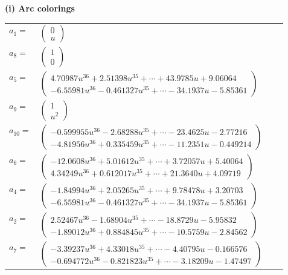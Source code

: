\documentclass[1p]{elsarticle_modified}
\theoremstyle{definition}
\begin{document}
\flushleft \textbf{(i) Arc colorings}\\
\begin{tabular}{m{7pt} m{180pt} m{7pt} m{180pt} }
\flushright $a_{1}=$&$\begin{pmatrix}0\\u\end{pmatrix}$ \\
\flushright $a_{8}=$&$\begin{pmatrix}1\\0\end{pmatrix}$ \\
\flushright $a_{5}=$&$\begin{pmatrix}4.70987 u^{36}+2.51398 u^{35}+\cdots+43.9785 u+9.06064\\-6.55981 u^{36}-0.461327 u^{35}+\cdots-34.1937 u-5.85361\end{pmatrix}$ \\
\flushright $a_{9}=$&$\begin{pmatrix}1\\u^2\end{pmatrix}$ \\
\flushright $a_{10}=$&$\begin{pmatrix}-0.599955 u^{36}-2.68288 u^{35}+\cdots-23.4625 u-2.77216\\-4.81956 u^{36}+0.335459 u^{35}+\cdots-11.2351 u-0.449214\end{pmatrix}$ \\
\flushright $a_{6}=$&$\begin{pmatrix}-12.0608 u^{36}+5.01612 u^{35}+\cdots+3.72057 u+5.40064\\4.34249 u^{36}+0.612017 u^{35}+\cdots+21.3640 u+4.09719\end{pmatrix}$ \\
\flushright $a_{4}=$&$\begin{pmatrix}-1.84994 u^{36}+2.05265 u^{35}+\cdots+9.78478 u+3.20703\\-6.55981 u^{36}-0.461327 u^{35}+\cdots-34.1937 u-5.85361\end{pmatrix}$ \\
\flushright $a_{2}=$&$\begin{pmatrix}2.52467 u^{36}-1.68904 u^{35}+\cdots-18.8729 u-5.95832\\-1.89012 u^{36}+0.884845 u^{35}+\cdots-10.5759 u-2.84562\end{pmatrix}$ \\
\flushright $a_{7}=$&$\begin{pmatrix}-3.39237 u^{36}+4.33018 u^{35}+\cdots-4.40795 u-0.166576\\-0.694772 u^{36}-0.821823 u^{35}+\cdots-3.18209 u-1.47497\end{pmatrix}$ \\

\end{tabular}
\end{document}
